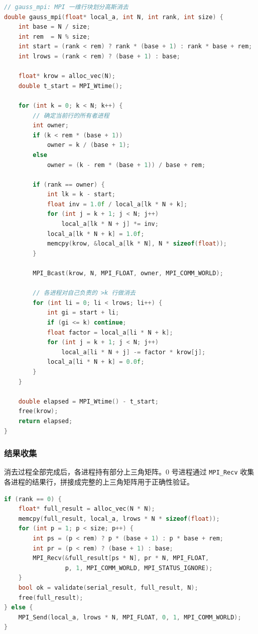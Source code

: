 \documentclass[a4paper]{article}
\begin{document}
\begin{lstlisting}[title=MPI 一维行块划分核心代码,frame=trbl,language={C++}]
// gauss_mpi: MPI 一维行块划分高斯消去
double gauss_mpi(float* local_a, int N, int rank, int size) {
    int base = N / size;
    int rem  = N % size;
    int start = (rank < rem) ? rank * (base + 1) : rank * base + rem;
    int lrows = (rank < rem) ? (base + 1) : base;

    float* krow = alloc_vec(N);
    double t_start = MPI_Wtime();

    for (int k = 0; k < N; k++) {
        // 确定当前行的所有者进程
        int owner;
        if (k < rem * (base + 1))
            owner = k / (base + 1);
        else
            owner = (k - rem * (base + 1)) / base + rem;

        if (rank == owner) {
            int lk = k - start;
            float inv = 1.0f / local_a[lk * N + k];
            for (int j = k + 1; j < N; j++)
                local_a[lk * N + j] *= inv;
            local_a[lk * N + k] = 1.0f;
            memcpy(krow, &local_a[lk * N], N * sizeof(float));
        }

        MPI_Bcast(krow, N, MPI_FLOAT, owner, MPI_COMM_WORLD);

        // 各进程对自己负责的 >k 行做消去
        for (int li = 0; li < lrows; li++) {
            int gi = start + li;
            if (gi <= k) continue;
            float factor = local_a[li * N + k];
            for (int j = k + 1; j < N; j++)
                local_a[li * N + j] -= factor * krow[j];
            local_a[li * N + k] = 0.0f;
        }
    }

    double elapsed = MPI_Wtime() - t_start;
    free(krow);
    return elapsed;
}
\end{lstlisting}

\subsubsection{结果收集}

消去过程全部完成后，各进程持有部分上三角矩阵。0 号进程通过 \texttt{MPI\_Recv} 收集各进程的结果行，拼接成完整的上三角矩阵用于正确性验证。

\begin{lstlisting}[title=结果收集与验证,frame=trbl,language={C++}]
if (rank == 0) {
    float* full_result = alloc_vec(N * N);
    memcpy(full_result, local_a, lrows * N * sizeof(float));
    for (int p = 1; p < size; p++) {
        int ps = (p < rem) ? p * (base + 1) : p * base + rem;
        int pr = (p < rem) ? (base + 1) : base;
        MPI_Recv(&full_result[ps * N], pr * N, MPI_FLOAT,
                 p, 1, MPI_COMM_WORLD, MPI_STATUS_IGNORE);
    }
    bool ok = validate(serial_result, full_result, N);
    free(full_result);
} else {
    MPI_Send(local_a, lrows * N, MPI_FLOAT, 0, 1, MPI_COMM_WORLD);
}
\end{lstlisting}
\end{document}
